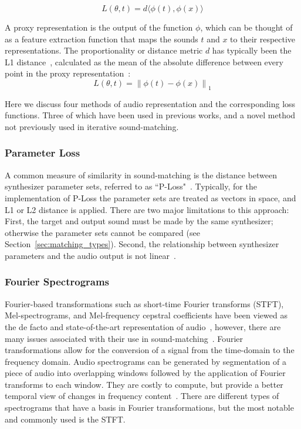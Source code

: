 \documentclass[lettersize,journal]{IEEEtran}
\providecommand{\gls}[1]{#1}
\begin{document}
\[
L(\theta, t) = d\langle\phi(t),\phi(x)\rangle
\]

\noindent

A proxy representation is the output of the function \( \phi \), which can be thought of as a feature extraction function that maps the sounds \( t \) and \( x \) to their respective representations. 
The proportionality or distance metric $d$ has typically been the L1 distance~\cite{turian2020sorry,richard2025model}, calculated as the mean of the absolute difference between every point in the proxy representation~\cite{engel2020ddsp,vahidi2023mesostructures}:
\[
L(\theta, t) = \left\| \phi(t) - \phi(x) \right\|_1
\]

Here we discuss four methods of audio representation and the corresponding loss functions. Three of which have been used in previous works, and a novel method not previously used in iterative sound-matching. 

\subsubsection{Parameter Loss}
A common measure of similarity in sound-matching is the distance between synthesizer parameter sets, referred to as ``P-Loss"~\cite{han2023perceptual}. Typically, for the implementation of P-Loss the parameter sets are treated as vectors in space, and L1 or L2 distance is applied. There are two major limitations to this approach: First, the target and output sound must be made by the same synthesizer; otherwise the parameter sets cannot be compared (see Section~\ref{sec:matching_types}). Second, the relationship between synthesizer parameters and the audio output is not linear~\cite{shier2020spiegelib,han2023perceptual,esling2019flow}. 

\subsubsection{Fourier Spectrograms}
\label{sec:fourier_specs}
Fourier-based transformations such as short-time Fourier transforms (\gls{STFT}), Mel-spectrograms, and Mel-frequency cepstral coefficients have been viewed as the de facto and state-of-the-art representation of audio~\cite{beauchamp2003error,mitchell2007evolutionary,yee2018automatic}, however, there are many issues associated with their use in sound-matching~\cite{turian2020sorry,vahidi2023mesostructures,han2023perceptual,uzrad2024diffmoog}. Fourier transformations allow for the conversion of a signal from the time-domain to the frequency domain. Audio spectrograms can be generated by segmentation of a piece of audio into overlapping windows followed by the application of Fourier transforms to each window. They are costly to compute, but provide a better temporal view of changes in frequency content~\cite{muller2007dynamic,smith2007mathematics}. There are different types of spectrograms that have a basis in Fourier transformations, but the most notable and commonly used is the STFT.  
\end{document}
